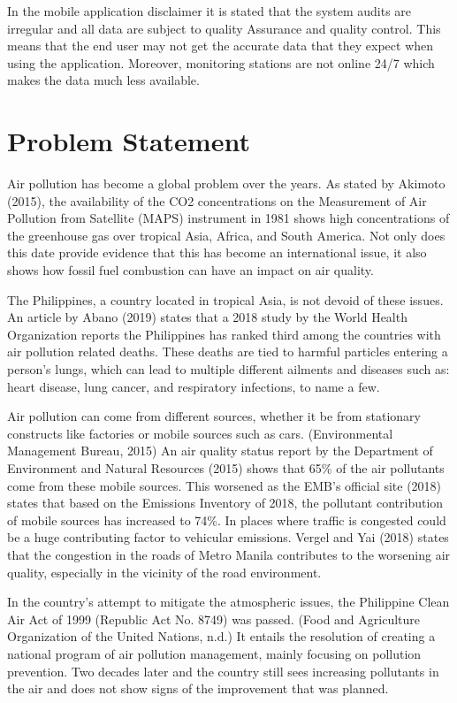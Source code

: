 In the mobile application disclaimer it is stated that the system audits are irregular and all data are subject to quality Assurance and quality control. This means that the end user may not get the accurate data that they expect when using the application. Moreover, monitoring stations are not online 24/7 which makes the data much less available.


\section{Problem Statement}
	Air pollution has become a global problem over the years. As stated by Akimoto (2015), the availability of the CO2 concentrations on the Measurement of Air Pollution from Satellite (MAPS) instrument in 1981 shows high concentrations of the greenhouse gas over tropical Asia, Africa, and South America. Not only does this date provide evidence that this has become an international issue, it also shows how fossil fuel combustion can have an impact on air quality. 

The Philippines, a country located in tropical Asia, is not devoid of these issues. An article by Abano (2019) states that a 2018 study by the World Health Organization reports the Philippines has ranked third among the countries with air pollution related deaths. These deaths are tied to harmful particles entering a person’s lungs, which can lead to multiple different ailments and diseases such as: heart disease, lung cancer, and respiratory infections, to name a few.

Air pollution can come from different sources, whether it be from stationary constructs like factories or mobile sources such as cars. (Environmental Management Bureau, 2015)  An air quality status report by the Department of Environment and Natural Resources (2015) shows that 65\% of the air pollutants come from these mobile sources. This worsened as the EMB’s official site (2018) states that based on the Emissions Inventory of 2018, the pollutant contribution of mobile sources has increased to  74\%. In places where traffic is congested could be a huge contributing factor to vehicular emissions. Vergel and Yai (2018) states that the congestion in the roads of Metro Manila contributes to the worsening air quality, especially in the vicinity of the road environment.

In the country’s attempt to mitigate the atmospheric issues, the Philippine Clean Air Act of 1999 (Republic Act No. 8749) was passed. (Food and Agriculture Organization of the United Nations, n.d.) It entails the resolution of creating a national program of air pollution management, mainly focusing on pollution prevention. Two decades later and the country still sees increasing pollutants in the air and does not show signs of the improvement that was planned.


